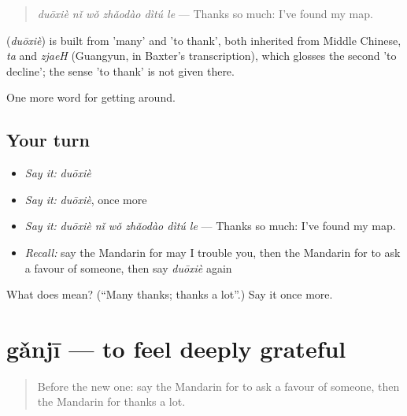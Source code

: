 \begin{quote}
\textbf{} \emph{duōxiè nǐ wǒ zhǎodào dìtú le} — Thanks so much: I've found my map.
\end{quote}

\begin{cousinweb}
\textbf{} (\emph{duōxiè}) is built from  'many' and  'to thank', both inherited from Middle Chinese, \emph{ta} and \emph{zjaeH} (Guangyun, in Baxter's transcription), which glosses the second 'to decline'; the sense 'to thank' is not given there.
\end{cousinweb}

\begin{grammarlens}[title={What you've built}]
One more word for getting around.
\end{grammarlens}

\subsection*{Your turn}
\begin{itemize}
\raggedright
  \item \emph{Say it:} \emph{duōxiè}
  \item \emph{Say it:} \emph{duōxiè}, once more
  \item \emph{Say it:} \emph{duōxiè nǐ wǒ zhǎodào dìtú le} — Thanks so much: I've found my map.
  \item \emph{Recall:} say the Mandarin for may I trouble you, then the Mandarin for to ask a favour of someone, then say \emph{duōxiè} again
\end{itemize}

\begin{tcolorbox}[breakable,colback=teal!4,colframe=teal!35!black,title={Before you move on}]
What does  mean? (\textquotedblleft{}Many thanks; thanks a lot\textquotedblright{}.) Say it once more.
\end{tcolorbox}
\section[gǎnjī]{gǎnjī — to feel deeply grateful}

\label{lesson:ZH-C457-ganji-grateful}



\begin{quote}
Before the new one: say the Mandarin for to ask a favour of someone, then the Mandarin for thanks a lot.
\end{quote}

